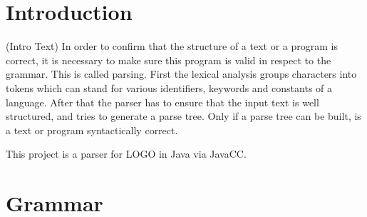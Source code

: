 \chapter{Introduction}
\label{chap:intro}
(Intro Text) In order to confirm that the structure of a text or a program is correct, it is necessary to make sure this program is valid in respect to the grammar. This is called parsing. First the lexical analysis groups characters into tokens which can stand for various identifiers, keywords and constants of a language. After that the parser has to ensure that the input text is well structured, and tries to generate a parse tree. Only if a parse tree can be built, is a text or program syntactically correct.

This project is a parser for LOGO in Java via JavaCC.

\begingroup
\renewcommand{\cleardoublepage}{}
\renewcommand{\clearpage}{}
\chapter{Grammar}
\label{chap:grammar}
%
\endgroup